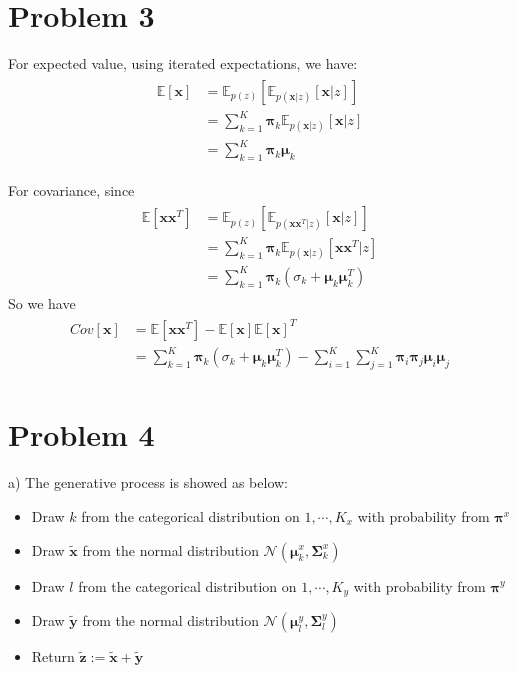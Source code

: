 \documentclass{article}
\begin{document}
\section*{Problem 3}
For expected value, using iterated expectations, we have:
\begin{eqnarray}
	\begin{aligned}
		\mathbb{E}[\bm{x}] 
		&= \mathbb{E}_{p(z)}[\mathbb{E}_{p(\bm{x}|z)}[\bm{x}|z]]\\
		&= \sum_{k=1}^{K} \bm{\pi}_k \mathbb{E}_{p(\bm{x}|z)}[\bm{x}|z]\\
		&= \sum_{k=1}^{K} \bm{\pi}_k \bm{\mu}_k
	\end{aligned}
\end{eqnarray}

For covariance, since
\begin{eqnarray}
	\begin{aligned}
		\mathbb{E}[\bm{xx}^T] 
		&= \mathbb{E}_{p(z)}[\mathbb{E}_{p(\bm{xx}^T|z)}[\bm{x}|z]]\\
		&= \sum_{k=1}^{K} \bm{\pi}_k \mathbb{E}_{p(\bm{x}|z)}[\bm{xx}^T|z]\\
		&= \sum_{k=1}^{K} \bm{\pi}_k(\sigma_k + \bm{\mu}_k\bm{\mu}_k^T)
	\end{aligned}
\end{eqnarray}
So we have
\begin{eqnarray}
	\begin{aligned}
		Cov[\bm{x}]
		&= \mathbb{E}[\bm{xx}^T] - \mathbb{E}[\bm{x}]\mathbb{E}[\bm{x}]^T\\
		&= \sum_{k=1}^{K} \bm{\pi}_k(\sigma_k + \bm{\mu}_k\bm{\mu}_k^T) - \sum_{i=1}^{K} \sum_{j=1}^{K} \bm{\pi}_i \bm{\pi}_j \bm{\mu}_i \bm{\mu}_j
	\end{aligned}
\end{eqnarray}


\section*{Problem 4}
a) The generative process is showed as below:
\begin{itemize}
	\item Draw $k$ from the categorical distribution on ${1, \cdots, K_x}$ with probability from $\bm{\pi}^x$
	\item Draw $\tilde{\bm{x}}$ from the normal distribution $\mathcal{N}(\bm{\mu}_k^x, \bm{\Sigma}_k^x)$
	\item Draw $l$ from the categorical distribution on ${1, \cdots, K_y}$ with probability from $\bm{\pi}^y$
	\item Draw $\tilde{\bm{y}}$ from the normal distribution $\mathcal{N}(\bm{\mu}_l^y, \bm{\Sigma}_l^y)$
	\item Return $\tilde{\bm{z}} := \tilde{\bm{x}} + \tilde{\bm{y}}$
\end{itemize}
\end{document}
